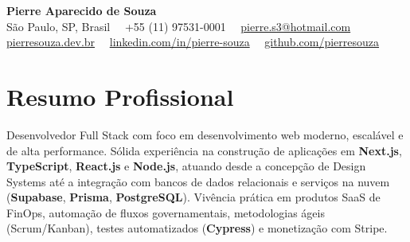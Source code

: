 \documentclass[a4paper,10pt]{article}
\begin{document}
\pagestyle{empty}

\begin{center}
    {\LARGE \textbf{Pierre Aparecido de Souza}} \\ \vspace{2pt}
    \small São Paulo, SP, Brasil \ \textbar \ +55 (11) 97531-0001 \ \textbar \ \href{mailto:pierre.s3@hotmail.com}{pierre.s3@hotmail.com} \\ \vspace{1pt}
    \href{https://pierresouza.dev.br}{pierresouza.dev.br} \ \textbar \ \href{https://linkedin.com/in/pierre-souza}{linkedin.com/in/pierre-souza} \ \textbar \ \href{https://github.com/pierresouza}{github.com/pierresouza}
\end{center}
\vspace{-6pt}

\section{Resumo Profissional}
\small{
Desenvolvedor Full Stack com foco em desenvolvimento web moderno, escalável e de alta performance. Sólida experiência na construção de aplicações em \textbf{Next.js}, \textbf{TypeScript}, \textbf{React.js} e \textbf{Node.js}, atuando desde a concepção de Design Systems até a integração com bancos de dados relacionais e serviços na nuvem (\textbf{Supabase}, \textbf{Prisma}, \textbf{PostgreSQL}). Vivência prática em produtos SaaS de FinOps, automação de fluxos governamentais, metodologias ágeis (Scrum/Kanban), testes automatizados (\textbf{Cypress}) e monetização com Stripe.
}

\end{document}
